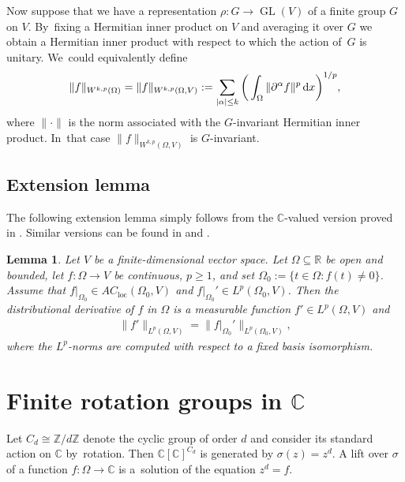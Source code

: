 \documentclass[pdftex]{sigma}
\numberwithin{equation}{section}
\newtheorem{Lemma}[Theorem]{Lemma}
\def\al{\alpha}
\def\rh{\rho}
\def\si{\sigma}
\def\Om{\Omega}
\def\C{\mathbb{C}}
\def\R{\mathbb{R}}
\def\Z{\mathbb{Z}}
\def\p{\partial}
\let\on=\operatorname
\begin{document}
Now suppose that we have a representation $\rh \colon G \to \on{GL}(V)$ of a finite group $G$ on
$V$. By~fixing a Hermitian inner product on $V$ and averaging it over $G$ we obtain a Hermitian inner product
with respect to which the action of~$G$ is unitary. We~could equivalently define
\begin{gather*}
 \|f\|_{W^{k,p}(\Om)} = \|f\|_{W^{k,p}(\Om,V)} := \sum_{|\al| \le k} \bigg(\int_{\Om} \|\p^\al f\|^p \, {\rm d}x\bigg)^{1/p},
 \end{gather*}
 where $\|\cdot\|$ is the norm associated with the $G$-invariant Hermitian inner product. In~that case $\|f\|_{W^{k,p}(\Om,V)}$ is $G$-invariant.


\subsection{Extension lemma}


The following extension lemma simply follows from the $\C$-valued version proved in \cite{ParusinskiRainer15}.
Similar versions can be found in \cite[Lemma 2.1]{ParusinskiRainerAC}
and \cite[Lemma 3.2]{GhisiGobbino13}.

\begin{Lemma} \label{lem:extend}
 Let $V$ be a finite-dimensional vector space.
 Let $\Om \subseteq \R$ be open and bounded, let $f \colon \Om \to V$ be continuous, $p \ge 1$,
 and set $\Om_0 := \{t \in \Om \colon f(t) \ne 0\}$.
 Assume that $f|_{\Om_0} \in AC_{\on{loc}}(\Om_0,V)$ and $f|_{\Om_0}' \in L^p(\Om_0,V)$.
 Then the distributional derivative of $f$ in $\Om$ is a measurable function $f' \in L^p(\Om,V)$ and
 \begin{gather*} %
 \|f'\|_{L^p(\Om,V)} = \|f|_{\Om_0}'\|_{L^p(\Om_0,V)},
 \end{gather*}
 where the $L^p$-norms are computed with respect to a fixed basis isomorphism.
\end{Lemma}

\section[Finite rotation groups in C]{Finite rotation groups in $\C$}\label{radicals}

Let $C_d \cong \Z/d\Z$ denote the cyclic group of order $d$ and consider its standard action on $\C$ by~rota\-tion.
Then $\C[\C]^{C_d}$ is generated by $\si(z) = z^d$. A lift over $\si$ of a function $f \colon \Om \to \C$ is a~solution of the
equation $z^d = f$.
\end{document}
